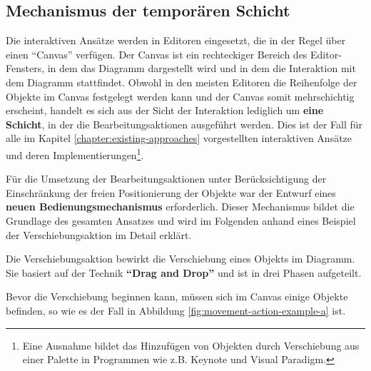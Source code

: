 \subsection{Mechanismus der temporären Schicht}

Die interaktiven Ansätze werden in Editoren eingesetzt, die in der Regel über einen \enquote{Canvas} verfügen. Der Canvas ist ein rechteckiger Bereich des Editor-Fensters, in dem das Diagramm dargestellt wird und in dem die Interaktion mit dem Diagramm stattfindet. Obwohl in den meisten Editoren die Reihenfolge der Objekte im Canvas festgelegt werden kann und der Canvas somit mehrschichtig erscheint, handelt es sich aus der Sicht der Interaktion lediglich um \textbf{eine Schicht}, in der die Bearbeitungsaktionen ausgeführt werden. Dies ist der Fall für alle im Kapitel \ref{chapter:existing-approaches} vorgestellten interaktiven Ansätze und deren Implementierungen\footnote{Eine Ausnahme bildet das Hinzufügen von Objekten durch Verschiebung aus einer Palette in Programmen wie z.B. Keynote und Visual Paradigm.}.

Für die Umsetzung der Bearbeitungsaktionen unter Berücksichtigung der Einschränkung der freien Positionierung der Objekte war der Entwurf eines \textbf{neuen Bedienungsmechanismus} erforderlich. Dieser Mechanismus bildet die Grundlage des gesamten Ansatzes und wird im Folgenden anhand eines Beispiel der Verschiebungsaktion im Detail erklärt.

Die Verschiebungsaktion bewirkt die Verschiebung eines Objekts im Diagramm. Sie basiert auf der Technik \textbf{\enquote{Drag and Drop}} und ist in drei Phasen aufgeteilt.

Bevor die Verschiebung beginnen kann, müssen sich im Canvas einige Objekte befinden, so wie es der Fall in Abbildung \ref{fig:movement-action-example-a} ist.

